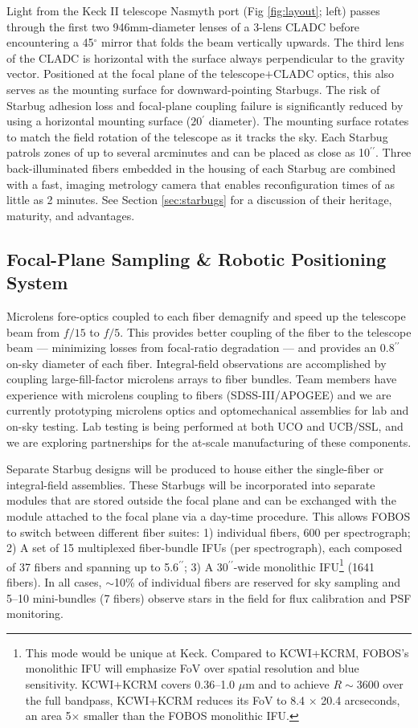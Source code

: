 \documentclass[oneside,11pt]{amsart}
\newcommand{\arcmin}{\mbox{$^{\prime}$}}
\newcommand{\arcsec}{\mbox{$^{\prime\prime}$}}
\begin{document}
Light from the Keck II telescope Nasmyth port (Fig \ref{fig:layout};
left) passes through the first two 946mm-diameter lenses of a 3-lens
CLADC before encountering a 45$^\circ$ mirror that folds the beam
vertically upwards. The third lens of the CLADC is horizontal with
the surface always perpendicular to the gravity vector. Positioned at
the focal plane of the telescope$+$CLADC optics, this also serves as
the mounting surface for downward-pointing Starbugs. The risk of
Starbug adhesion loss and focal-plane coupling failure is
significantly reduced by using a horizontal mounting surface
($20\arcmin$ diameter). The mounting surface rotates to match the
field rotation of the telescope as it tracks the sky. Each Starbug
patrols zones of up to several arcminutes and can be placed as close
as 10\arcsec. Three back-illuminated fibers embedded in the housing
of each Starbug are combined with a fast, imaging metrology camera
that enables reconfiguration times of as little as 2 minutes. See
Section \ref{sec:starbugs} for a discussion of their heritage,
maturity, and advantages.

\subsection{Focal-Plane Sampling \& Robotic Positioning System}

Microlens fore-optics coupled to each fiber demagnify and speed up
the telescope beam from $f/15$ to $f/5$. This provides better
coupling of the fiber to the telescope beam --- minimizing losses
from focal-ratio degradation --- and provides an $0.8\arcsec$ on-sky
diameter of each fiber. Integral-field observations are accomplished
by coupling large-fill-factor microlens arrays to fiber bundles. Team
members have experience with microlens coupling to fibers
(SDSS-III/APOGEE) and we are currently prototyping microlens optics
and optomechanical assemblies for lab and on-sky testing. Lab testing
is being performed at both UCO and UCB/SSL, and we are exploring
partnerships for the at-scale manufacturing of these components.

Separate Starbug designs will be produced to house either the
single-fiber or integral-field assemblies. These Starbugs will be
incorporated into separate modules that are stored outside the focal
plane and can be exchanged with the module attached to the focal
plane via a day-time procedure. This allows FOBOS to switch between
different fiber suites: 1) individual fibers, 600 per spectrograph;
2) A set of 15 multiplexed fiber-bundle IFUs (per spectrograph), each
composed of 37 fibers and spanning up to 5.6\arcsec; 3) A
30\arcsec-wide monolithic IFU\footnote{This mode would be unique at
Keck. Compared to KCWI+KCRM, FOBOS's monolithic IFU will emphasize
FoV over spatial resolution and blue sensitivity. KCWI+KCRM covers
0.36--1.0 $\mu$m and to achieve $R \sim 3600$ over the full bandpass,
KCWI+KCRM reduces its FoV to 8.4 $\times$ 20.4 arcseconds, an area
5$\times$ smaller than the FOBOS monolithic IFU.} (1641 fibers). In
all cases, $\sim$10\% of individual fibers are reserved for sky
sampling and 5--10 mini-bundles (7 fibers) observe stars in the field
for flux calibration and PSF monitoring.
\end{document}

